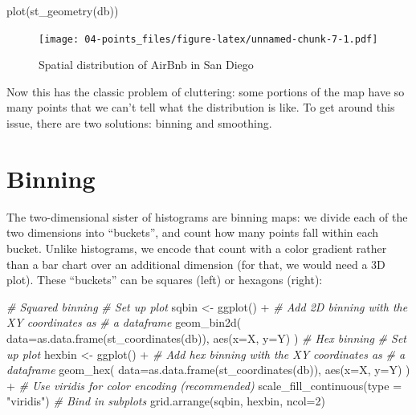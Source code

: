 \documentclass[
]{book}
\newenvironment{Shaded}{\begin{snugshade}}{\end{snugshade}}
\newcommand{\AttributeTok}[1]{\textcolor[rgb]{0.77,0.63,0.00}{#1}}
\newcommand{\CommentTok}[1]{\textcolor[rgb]{0.56,0.35,0.01}{\textit{#1}}}
\newcommand{\DecValTok}[1]{\textcolor[rgb]{0.00,0.00,0.81}{#1}}
\newcommand{\FunctionTok}[1]{\textcolor[rgb]{0.00,0.00,0.00}{#1}}
\newcommand{\NormalTok}[1]{#1}
\newcommand{\OtherTok}[1]{\textcolor[rgb]{0.56,0.35,0.01}{#1}}
\newcommand{\SpecialCharTok}[1]{\textcolor[rgb]{0.00,0.00,0.00}{#1}}
\newcommand{\StringTok}[1]{\textcolor[rgb]{0.31,0.60,0.02}{#1}}
\begin{document}
\begin{Shaded}
\begin{Highlighting}[]
\FunctionTok{plot}\NormalTok{(}\FunctionTok{st\_geometry}\NormalTok{(db))}
\end{Highlighting}
\end{Shaded}

\begin{figure}
\centering
\texttt{[image: 04-points\_files/figure-latex/unnamed-chunk-7-1.pdf]}
\caption{\label{fig:unnamed-chunk-7}Spatial distribution of AirBnb in San Diego}
\end{figure}

Now this has the classic problem of cluttering: some portions of the map have so many points that we can't tell what the distribution is like. To get around this issue, there are two solutions: binning and smoothing.

\hypertarget{binning}{%
\section{Binning}\label{binning}}

The two-dimensional sister of histograms are binning maps: we divide each of the two dimensions into ``buckets'', and count how many points fall within each bucket. Unlike histograms, we encode that count with a color gradient rather than a bar chart over an additional dimension (for that, we would need a 3D plot). These ``buckets'' can be squares (left) or hexagons (right):

\begin{Shaded}
\begin{Highlighting}[]
      \CommentTok{\# Squared binning}
\CommentTok{\# Set up plot}
\NormalTok{sqbin }\OtherTok{\textless{}{-}} \FunctionTok{ggplot}\NormalTok{() }\SpecialCharTok{+} 
\CommentTok{\# Add 2D binning with the XY coordinates as}
\CommentTok{\# a dataframe}
  \FunctionTok{geom\_bin2d}\NormalTok{(}
    \AttributeTok{data=}\FunctionTok{as.data.frame}\NormalTok{(}\FunctionTok{st\_coordinates}\NormalTok{(db)), }
    \FunctionTok{aes}\NormalTok{(}\AttributeTok{x=}\NormalTok{X, }\AttributeTok{y=}\NormalTok{Y)}
\NormalTok{  )}
      \CommentTok{\# Hex binning}
\CommentTok{\# Set up plot}
\NormalTok{hexbin }\OtherTok{\textless{}{-}} \FunctionTok{ggplot}\NormalTok{() }\SpecialCharTok{+}
\CommentTok{\# Add hex binning with the XY coordinates as}
\CommentTok{\# a dataframe }
  \FunctionTok{geom\_hex}\NormalTok{(}
    \AttributeTok{data=}\FunctionTok{as.data.frame}\NormalTok{(}\FunctionTok{st\_coordinates}\NormalTok{(db)),}
    \FunctionTok{aes}\NormalTok{(}\AttributeTok{x=}\NormalTok{X, }\AttributeTok{y=}\NormalTok{Y)}
\NormalTok{  ) }\SpecialCharTok{+}
\CommentTok{\# Use viridis for color encoding (recommended)}
  \FunctionTok{scale\_fill\_continuous}\NormalTok{(}\AttributeTok{type =} \StringTok{"viridis"}\NormalTok{)}
      \CommentTok{\# Bind in subplots}
\FunctionTok{grid.arrange}\NormalTok{(sqbin, hexbin, }\AttributeTok{ncol=}\DecValTok{2}\NormalTok{)}
\end{Highlighting}
\end{Shaded}
\end{document}
